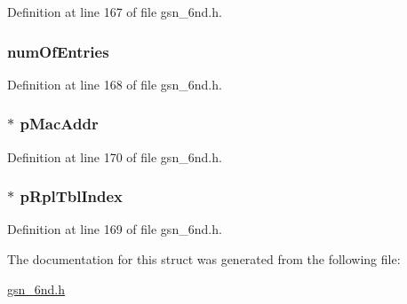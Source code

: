Definition at line 167 of file gsn\_\-6nd.h.

\hypertarget{a00204_a78205f26db26ba32892f92e1f48491c4}{
\subsubsection[{numOfEntries}]{ {\bf numOfEntries}}}
\label{a00204_a78205f26db26ba32892f92e1f48491c4}


Definition at line 168 of file gsn\_\-6nd.h.

\hypertarget{a00204_a46a19f50aa31b0b18f53077d64e90439}{
\subsubsection[{pMacAddr}]{$\ast$ {\bf pMacAddr}}}
\label{a00204_a46a19f50aa31b0b18f53077d64e90439}


Definition at line 170 of file gsn\_\-6nd.h.

\hypertarget{a00204_a73a7256d53a8c7853f424ec33cc0cf0c}{
\subsubsection[{pRplTblIndex}]{$\ast$ {\bf pRplTblIndex}}}
\label{a00204_a73a7256d53a8c7853f424ec33cc0cf0c}


Definition at line 169 of file gsn\_\-6nd.h.



The documentation for this struct was generated from the following file:\begin{DoxyCompactItemize}
\item 
\hyperlink{a00473}{gsn\_\-6nd.h}\end{DoxyCompactItemize}
